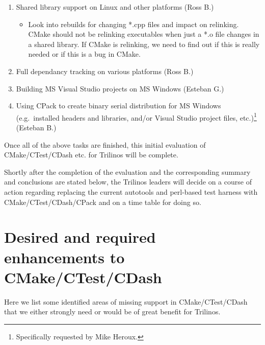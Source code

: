 \documentclass[pdf,ps2pdf,11pt]{SANDreport}
\begin{document}
\begin{enumerate}
\begin{enumerate}
  {}\item Shared library support on Linux and other platforms (Ross B.)

    \begin{itemize}

    {}\item Look into rebuilds for changing *.cpp files and impact on
    relinking.  CMake should not be relinking executables when just a
    *.o file changes in a shared library.  If CMake is relinking, we
    need to find out if this is really needed or if this is a bug in
    CMake.

    \end{itemize}

  {}\item Full dependancy tracking on various platforms (Ross B.)

  {}\item Building MS Visual Studio projects on MS Windows (Esteban G.)

  {}\item Using CPack to create binary serial distribution for MS
  Windows (e.g.\ installed headers and libraries, and/or Visual Studio
  project files, etc.)\footnote{Specifically requested by Mike
  Heroux.} (Esteban B.)

  \end{enumerate}

\end{enumerate}

Once all of the above tasks are finished, this initial evaluation of
CMake/CTest/CDash etc. for Trilinos will be complete.

Shortly after the completion of the evaluation and the corresponding
summary and conclusions are stated below, the Trilinos leaders will
decide on a course of action regarding replacing the current autotools
and perl-based test harness with CMake/CTest/CDash/CPack and on a time
table for doing so.

%
\section{Desired and required enhancements to CMake/CTest/CDash}
%

Here we list some identified areas of missing support in
CMake/CTest/CDash that we either strongly need or would be of great
benefit for Trilinos.
\end{document}
